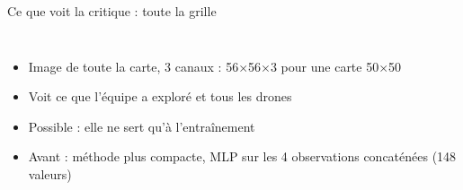\documentclass[aspectratio=169,11pt]{beamer}
\newcommand{\tunnels}{0/3,1/3,2/3,3/3,4/3,5/3,6/3,2/0,2/1,2/2,2/4,2/5,2/6,5/4,5/5,5/6}
\newcommand{\exploredcells}{0/3,1/3,2/3,3/3,4/3,2/4,2/5,2/2}
\newcommand{\dronecells}{4/3,2/5,2/2,1/3}
\newcommand{\gridlines}{\draw[step=1,gray!50,very thin] (0,0) grid (7,7);}
\begin{document}
\begin{frame}{Ce que voit la critique : toute la grille}
  \begin{columns}[c]
    \centering

    \small
    \begin{itemize}
      \item Image de toute la carte, 3 canaux : 56$\times$56$\times$3 pour une carte 50$\times$50
      \item Voit ce que l'équipe a exploré et tous les drones
      \item Possible : elle ne sert qu'à l'entraînement
      \item Avant : méthode plus compacte, MLP sur les 4 observations concaténées (148 valeurs)
    \end{itemize}
  \end{columns}
\end{frame}
\end{document}
